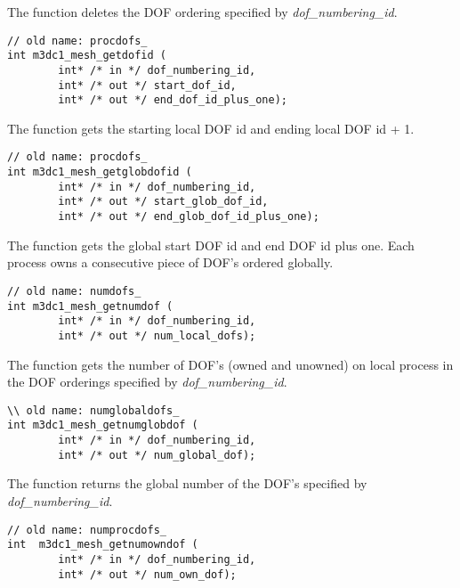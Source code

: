 The function deletes the DOF ordering specified by \textit{dof\_numbering\_id}. 

\begin{verbatim}
// old name: procdofs_
int m3dc1_mesh_getdofid (
        int* /* in */ dof_numbering_id, 
        int* /* out */ start_dof_id, 
        int* /* out */ end_dof_id_plus_one); 
\end{verbatim}\vspace{-.5cm}\hspace{1cm}

The function gets the starting local DOF id and ending local DOF id + 1. 

\begin{verbatim}
// old name: procdofs_
int m3dc1_mesh_getglobdofid (
        int* /* in */ dof_numbering_id, 
        int* /* out */ start_glob_dof_id, 
        int* /* out */ end_glob_dof_id_plus_one); 
\end{verbatim}\vspace{-.5cm}\hspace{1cm}

The function gets the global start DOF id and end DOF id plus one. Each process owns a consecutive piece of DOF's ordered globally. 

\begin{verbatim}
// old name: numdofs_
int m3dc1_mesh_getnumdof (
        int* /* in */ dof_numbering_id, 
        int* /* out */ num_local_dofs); 
\end{verbatim}\vspace{-.5cm}\hspace{1cm}
 
The function gets the number of DOF's (owned and unowned) on local process in the DOF orderings specified by \textit{dof\_numbering\_id}. 

\begin{verbatim}
\\ old name: numglobaldofs_
int m3dc1_mesh_getnumglobdof (
        int* /* in */ dof_numbering_id, 
        int* /* out */ num_global_dof);
\end{verbatim}\vspace{-.5cm}\hspace{1cm}

The function returns the global number of the DOF's specified by \textit{dof\_numbering\_id}.  

\begin{verbatim}
// old name: numprocdofs_
int  m3dc1_mesh_getnumowndof (
        int* /* in */ dof_numbering_id, 
        int* /* out */ num_own_dof);
\end{verbatim}\vspace{-.5cm}\hspace{1cm}

